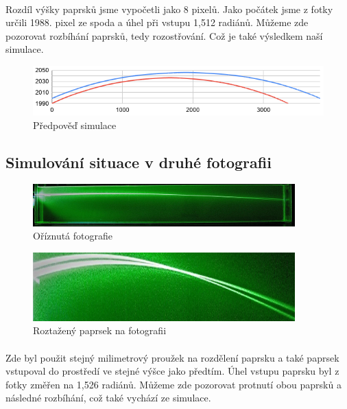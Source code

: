 \documentclass[10pt,a4paper]{article}
\begin{document}
\paragraph{}
Rozdíl výšky paprsků jsme vypočetli jako 8 pixelů. Jako počátek jsme z fotky určili 1988. pixel ze spoda a úhel při vstupu 1,512 radiánů.
Můžeme zde pozorovat rozbíhání paprsků, tedy rozostřování. Což je také výsledkem naší simulace.

\begin{figure}[H]
\centering
    \includegraphics[width=\textwidth]{rozbihavy.png}
    \caption{Předpověď simulace}
    \label{fig:chart1}
\end{figure}



\subsection{Simulování situace v druhé fotografii}

\begin{figure}[H]
\centering
    \includegraphics[width=0.9\textwidth]{image7.jpg}
    \caption{Oříznutá fotografie}
    \label{fig:chart1}
\end{figure}

\begin{figure}[H]
\centering
    \includegraphics[width=0.9\textwidth]{sbihavy-protazeny.jpg}
    \caption{Roztažený paprsek na fotografii}
    \label{fig:chart1}
\end{figure}

\paragraph{}
Zde byl použit stejný milimetrový proužek na rozdělení paprsku a také paprsek vstupoval do prostředí ve stejné výšce jako předtím. Úhel vstupu paprsku byl z fotky změřen na 1,526 radiánů.
Můžeme zde pozorovat protnutí obou paprsků a následné rozbíhání, což také vychází ze simulace.
\end{document}
